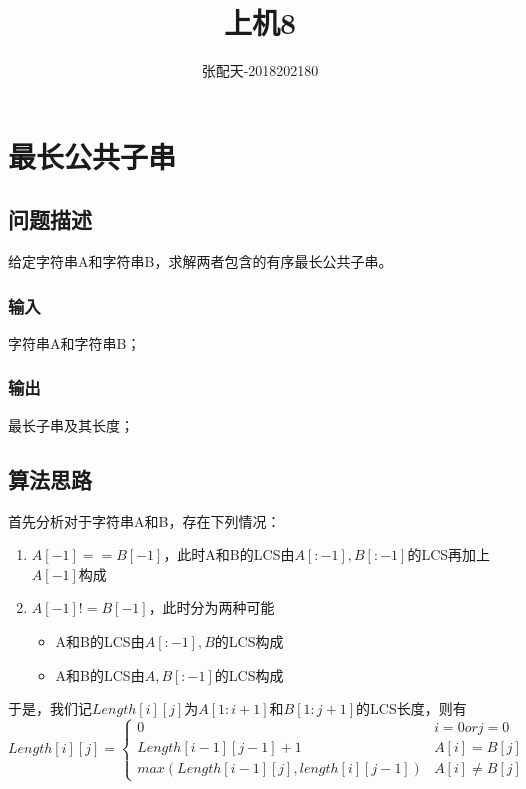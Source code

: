 \documentclass{ctexart}[UTF8]
\author{张配天-2018202180}
\title{上机8}
\begin{document}
    \maketitle
    \tableofcontents
    \clearpage
    \section{最长公共子串}
    \subsection{问题描述}
    给定字符串A和字符串B，求解两者包含的有序最长公共子串。
    \subsubsection{输入}
    字符串A和字符串B；
    \subsubsection{输出}
    最长子串及其长度；
    \subsection{算法思路}
    首先分析对于字符串A和B，存在下列情况：\begin{enumerate}
        \item $A[-1] == B[-1]$，此时A和B的LCS由$A[:-1],B[:-1]$的LCS再加上$A[-1]$构成
        \item $A[-1] != B[-1]$，此时分为两种可能\begin{itemize}
            \item A和B的LCS由$A[:-1],B$的LCS构成
            \item A和B的LCS由$A,B[:-1]$的LCS构成
        \end{itemize}
    \end{enumerate}
    \par 于是，我们记$Length[i][j]$为$A[1:i+1]$和$B[1:j+1]$的LCS长度，则有\begin{equation}
        Length[i][j] = \begin{cases}
            0& i=0 or j = 0\\
            Length[i-1][j-1] + 1&A[i] = B[j]\\
            max(Length[i-1][j],length[i][j-1])&A[i]\neq B[j]
        \end{cases}
    \end{equation}
\end{document}
